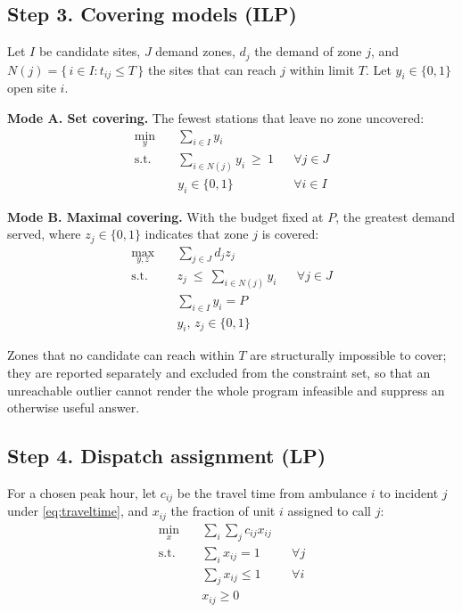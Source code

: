 \documentclass[conference]{IEEEtran}
\begin{document}
\subsection{Step 3. Covering models (ILP)}

Let $I$ be candidate sites, $J$ demand zones, $d_j$ the demand of zone $j$, and
$N(j) = \{\, i \in I : t_{ij} \le T \,\}$ the sites that can reach $j$ within
limit $T$. Let $y_i \in \{0,1\}$ open site $i$.

\textbf{Mode A. Set covering.} The fewest stations that leave no zone
uncovered:
\begin{align}
  \min_{y} \quad & \sum_{i \in I} y_i \label{eq:scp} \\
  \text{s.t.} \quad & \sum_{i \in N(j)} y_i \ \ge\ 1 && \forall j \in J
    \nonumber \\
  & y_i \in \{0,1\} && \forall i \in I \nonumber
\end{align}

\textbf{Mode B. Maximal covering.} With the budget fixed at $P$, the greatest
demand served, where $z_j \in \{0,1\}$ indicates that zone $j$ is covered:
\begin{align}
  \max_{y,z} \quad & \sum_{j \in J} d_j z_j \label{eq:mclp} \\
  \text{s.t.} \quad & z_j \ \le\ \sum_{i \in N(j)} y_i && \forall j \in J
    \nonumber \\
  & \sum_{i \in I} y_i = P \nonumber \\
  & y_i,\, z_j \in \{0,1\} \nonumber
\end{align}

Zones that no candidate can reach within $T$ are structurally impossible to
cover; they are reported separately and excluded from the constraint set, so
that an unreachable outlier cannot render the whole program infeasible and
suppress an otherwise useful answer.

\subsection{Step 4. Dispatch assignment (LP)}

For a chosen peak hour, let $c_{ij}$ be the travel time from ambulance $i$ to
incident $j$ under \eqref{eq:traveltime}, and $x_{ij}$ the fraction of unit $i$
assigned to call $j$:
\begin{align}
  \min_{x} \quad & \sum_{i}\sum_{j} c_{ij} x_{ij} \label{eq:ap} \\
  \text{s.t.} \quad & \sum_{i} x_{ij} = 1 && \forall j \\
  & \sum_{j} x_{ij} \le 1 && \forall i \\
  & x_{ij} \ge 0 \nonumber
\end{align}
\end{document}
